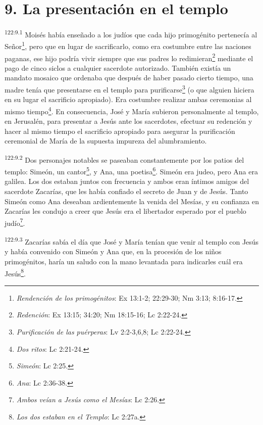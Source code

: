 \section*{9. La presentación en el templo}
\par
\textsuperscript{122:9.1} Moisés había enseñado a los judíos que cada hijo primogénito pertenecía al Señor\footnote{\textit{Rendención de los primogénitos}: Ex 13:1-2; 22:29-30; Nm 3:13; 8:16-17.}, pero que en lugar de sacrificarlo, como era costumbre entre las naciones paganas, ese hijo podría vivir siempre que sus padres lo redimieran\footnote{\textit{Redención}: Ex 13:15; 34:20; Nm 18:15-16; Lc 2:22-24.} mediante el pago de cinco siclos a cualquier sacerdote autorizado. También existía un mandato mosaico que ordenaba que después de haber pasado cierto tiempo, una madre tenía que presentarse en el templo para purificarse\footnote{\textit{Purificación de las puérperas}: Lv 2:2-3,6,8; Lc 2:22-24.} (o que alguien hiciera en su lugar el sacrificio apropiado). Era costumbre realizar ambas ceremonias al mismo tiempo\footnote{\textit{Dos ritos}: Lc 2:21-24.}. En consecuencia, José y María subieron personalmente al templo, en Jerusalén, para presentar a Jesús ante los sacerdotes, efectuar su redención y hacer al mismo tiempo el sacrificio apropiado para asegurar la purificación ceremonial de María de la supuesta impureza del alumbramiento.

\par
\textsuperscript{122:9.2} Dos personajes notables se paseaban constantemente por los patios del templo: Simeón, un cantor\footnote{\textit{Simeón}: Lc 2:25.}, y Ana, una poetisa\footnote{\textit{Ana}: Lc 2:36-38.}. Simeón era judeo, pero Ana era galilea. Los dos estaban juntos con frecuencia y ambos eran íntimos amigos del sacerdote Zacarías, que les había confiado el secreto de Juan y de Jesús. Tanto Simeón como Ana deseaban ardientemente la venida del Mesías, y su confianza en Zacarías les condujo a creer que Jesús era el libertador esperado por el pueblo judío\footnote{\textit{Ambos veían a Jesús como el Mesías}: Lc 2:26.}.

\par
\textsuperscript{122:9.3} Zacarías sabía el día que José y María tenían que venir al templo con Jesús y había convenido con Simeón y Ana que, en la procesión de los niños primogénitos, haría un saludo con la mano levantada para indicarles cuál era Jesús\footnote{\textit{Los dos estaban en el Templo}: Lc 2:27a.}.

